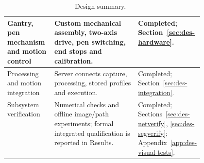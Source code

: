 \begin{table}[!htbp]
\begin{tabularx}{\linewidth}{|>{\raggedright\arraybackslash}p{0.24\linewidth}|>{\raggedright\arraybackslash}X|>{\raggedright\arraybackslash}p{0.23\linewidth}|}
Gantry, pen mechanism and motion control&Custom mechanical assembly, two-axis drive, pen switching, end stops and calibration.&Completed; Section~\ref{sec:des-hardware}.\\\hline
Processing and motion integration&Server connects capture, processing, stored profiles and execution.&Completed; Section~\ref{sec:des-integration}.\\\hline
Subsystem verification&Numerical checks and offline image/path experiments; formal integrated qualification is reported in Results.&Completed; Sections~\ref{sec:des-netverify}, \ref{sec:des-segverify}; Appendix~\ref{app:des-visual-tests}.\\\hline
\end{tabularx}
\caption{Design summary.~\cite{brauneevidence2026,braunepipeline2026}}
\label{tab:des-summary}
\end{table}

\FloatBarrier
